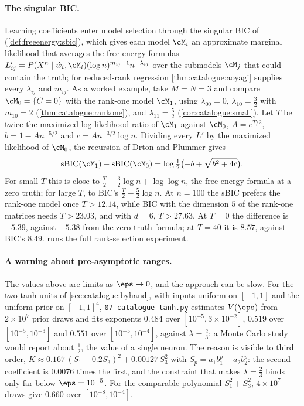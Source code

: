 \begin{refsection}
\paragraph{The singular BIC.} Learning coefficients enter model selection through the singular BIC of \textcite{DrtonPlummer2017} (\cref{def:freeenergy:sbic}), which gives each model $\cM_i$ an approximate marginal likelihood that averages the free energy formulas $L'_{ij}=P(X^n\mid\hat w_i,\cM_i)(\log n)^{m_{ij}-1}n^{-\lambda_{ij}}$ over the submodels $\cM_j$ that could contain the truth; for reduced-rank regression \cref{thm:catalogue:aoyagi} supplies every $\lambda_{ij}$ and $m_{ij}$. As a worked example, take $M=N=3$ and compare $\cM_0=\{C=0\}$ with the rank-one model $\cM_1$, using $\lambda_{00}=0$, $\lambda_{10}=\frac32$ with $m_{10}=2$ (\cref{thm:catalogue:rankone}), and $\lambda_{11}=\frac52$ (\cref{cor:catalogue:small}). Let $T$ be twice the maximized log-likelihood ratio of $\cM_1$ against $\cM_0$, $A=e^{T/2}$, $b=1-An^{-5/2}$ and $c=An^{-3/2}\log n$. Dividing every $L'$ by the maximized likelihood of $\cM_0$, the recursion of Drton and Plummer gives
\[
\mathrm{sBIC}(\cM_1)-\mathrm{sBIC}(\cM_0)=\log\tfrac12\bigl(-b+\sqrt{b^2+4c}\bigr).
\]
For small $T$ this is close to $\frac T2-\frac32\log n+\log\log n$, the free energy formula at a zero truth; for large $T$, to BIC's $\frac T2-\frac52\log n$. At $n=100$ the sBIC prefers the rank-one model once $T>12.14$, while BIC with the dimension $5$ of the rank-one matrices needs $T>23.03$, and with $d=6$, $T>27.63$. At $T=0$ the difference is $-5.39$, against $-5.38$ from the zero-truth formula; at $T=40$ it is $8.57$, against BIC's $8.49$.  runs the full rank-selection experiment.

\paragraph{A warning about pre-asymptotic ranges.} The values above are limits as $\eps\to0$, and the approach can be slow. For the two tanh units of \cref{sec:catalogue:byhand}, with inputs uniform on $[-1,1]$ and the uniform prior on $[-1,1]^4$, \texttt{07-catalogue-tanh.py} estimates $V(\eps)$ from $2\times10^7$ prior draws and fits exponents $0.484$ over $[10^{-5},3\times10^{-2}]$, $0.519$ over $[10^{-5},10^{-3}]$ and $0.551$ over $[10^{-5},10^{-4}]$, against $\lambda=\frac23$: a Monte Carlo study would report about $\frac12$, the value of a single neuron. The reason is visible to third order, $K\approx0.167\,(S_1-0.2S_3)^2+0.00127\,S_3^2$ with $S_p=a_1b_1^p+a_2b_2^p$: the second coefficient is $0.0076$ times the first, and the constraint that makes $\lambda=\frac23$ binds only far below $\eps=10^{-5}$. For the comparable polynomial $S_1^2+S_3^2$, $4\times10^7$ draws give $0.660$ over $[10^{-8},10^{-4}]$.


\end{refsection}
